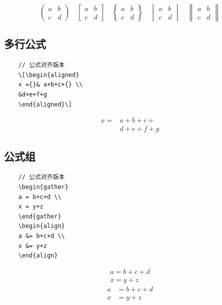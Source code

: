 \documentclass[UTF8]{book}
\begin{document}
{\begin{lstlisting}
	\end{lstlisting}
	\[ \begin{pmatrix} a&b\\c&d \end{pmatrix} \quad
	\begin{bmatrix} a&b\\c&d \end{bmatrix} \quad
	\begin{Bmatrix} a&b\\c&d \end{Bmatrix} \quad
	\begin{vmatrix} a&b\\c&d \end{vmatrix} \quad
	\begin{Vmatrix} a&b\\c&d \end{Vmatrix} \]
	
	\subsection{多行公式}
	\begin{lstlisting}
	// 公式对齐版本
	\[\begin{aligned}
	x ={}& a+b+c+{} \\
	&d+e+f+g
	\end{aligned}\]
	\end{lstlisting}
		\[\begin{aligned}
	x ={}& a+b+c+{} \\
	&d+e+f+g
	\end{aligned}\]
	
	\subsection{公式组}
	\begin{lstlisting}
	// 公式对齐版本
	\begin{gather}
	a = b+c+d \\
	x = y+z
	\end{gather}	
	\begin{align}	
	a &= b+c+d \\	
	x &= y+z
	\end{align}
	\end{lstlisting}
	
	\begin{gather}
	a = b+c+d \\
	x = y+z
	\end{gather}	
	\begin{align}	
	a &= b+c+d \\	
	x &= y+z
	\end{align}
	
}
\end{document}
